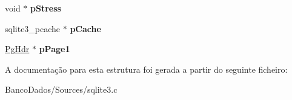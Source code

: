 \begin{DoxyCompactItemize}
\item 
\hypertarget{struct_p_cache_af04a2ea8a2c6d6b3eea7bb7051b8f447}{void $\ast$ {\bfseries p\-Stress}}\label{struct_p_cache_af04a2ea8a2c6d6b3eea7bb7051b8f447}

\item 
\hypertarget{struct_p_cache_ad0248655d30d327e0eeced6c3651b161}{sqlite3\-\_\-pcache $\ast$ {\bfseries p\-Cache}}\label{struct_p_cache_ad0248655d30d327e0eeced6c3651b161}

\item 
\hypertarget{struct_p_cache_a190ece57aafde4310e424f82998776cb}{\hyperlink{struct_pg_hdr}{Pg\-Hdr} $\ast$ {\bfseries p\-Page1}}\label{struct_p_cache_a190ece57aafde4310e424f82998776cb}

\end{DoxyCompactItemize}


A documentação para esta estrutura foi gerada a partir do seguinte ficheiro\-:\begin{DoxyCompactItemize}
\item 
Banco\-Dados/\-Sources/sqlite3.\-c\end{DoxyCompactItemize}
